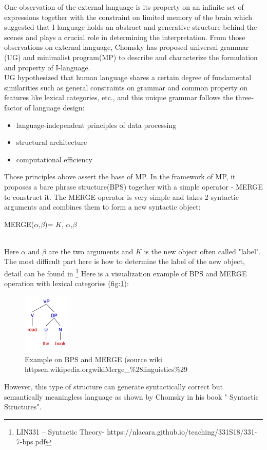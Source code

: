 \documentclass[12pt]{article}
\begin{document}
One observation of the external language is its property on an infinite set of expressions together with the constraint on limited memory of the brain which suggested that I-language holds an abstract and generative structure behind the scenes and plays a crucial role in determining the interpretation\cite{Tanaka_2019}. From those observations on external language, Chomsky has proposed universal grammar (UG) and minimalist program(MP) to describe and characterize the formulation and property of I-language.\\
UG hypothesized that human language shares a certain degree of fundamental similarities such as general constraints on grammar and common property on features like lexical categories\cite{D_browska_2015}, etc., and this unique grammar follows the three-factor of language design\cite{Chomsky_2005}:
\begin{itemize}
    \item language-independent principles of data processing
    \item structural architecture
    \item computational efficiency
\end{itemize}
Those principles above assert the base of MP. In the framework of MP, it proposes a bare phrase structure(BPS) together with a simple operator - MERGE to construct it.
The MERGE operator is very simple and takes 2 syntactic arguments and combines them to form a new syntactic object:\\
\begin{center} MERGE($\alpha$,$\beta$)= {$K$, {$\alpha$,$\beta$} } \end{center} \\
Here $\alpha$ and $\beta$ are the two arguments and $K$ is the new object often called "label". The most difficult part here is how to determine the label of the new object, detail can be found in \footnote{LIN331 – Syntactic Theory- https://nlacara.github.io/teaching/331S18/331-7-bps.pdf}
Here is a visualization example of BPS and MERGE operation with lexical categories (fig:\ref{fig:bps}):
\begin{figure} [!h]
\begin{center}
\includegraphics[width=0.2\textwidth]{figures/BSP_merge_lexical.png}
\caption{Example on BPS and MERGE (source\: wiki https\:\/\/en.wikipedia.org\/wiki\/Merge_\%28linguistics\%29} 
\label{fig:bps}
\end{center}
\end{figure}
However, this type of structure can generate syntactically correct but semantically meaningless language as shown by Chomsky in his book " Syntactic Structures".
\end{document}
